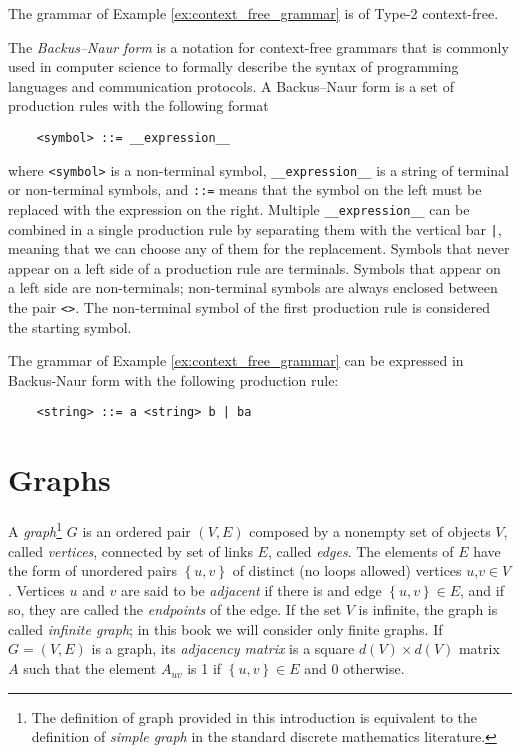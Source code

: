 \begin{example}
The grammar of Example \ref{ex:context_free_grammar} is of Type-2 context-free.
\end{example}

The \emph{Backus–Naur form} is a notation for context-free grammars that is commonly used in computer science to formally describe the syntax of programming languages and communication protocols. A Backus–Naur form is a set of production rules with the following format

\begin{verbatim}
    <symbol> ::= __expression__
\end{verbatim}

where \texttt{<symbol>} is a non-terminal symbol, \texttt{\_\_expression\_\_} is a string of terminal or non-terminal symbols, and \texttt{::=} means that the symbol on the left must be replaced with the expression on the right. Multiple  \texttt{\_\_expression\_\_} can be combined in a single production rule by separating them with the vertical bar \texttt{|}, meaning that we can choose any of them for the replacement. Symbols that never appear on a left side of a production rule are terminals. Symbols that appear on a left side are non-terminals; non-terminal symbols are always enclosed between the pair \texttt{<>}. The non-terminal symbol of the first production rule is considered the starting symbol.

\begin{example}
The grammar of Example \ref{ex:context_free_grammar} can be expressed in Backus-Naur form with the following production rule:
\begin{verbatim}
    <string> ::= a <string> b | ba
\end{verbatim}
\end{example}

%
%

\section{Graphs}
\label{sec:Graphs}

A \emph{graph}\footnote{The definition of graph provided in this introduction is equivalent to the definition of \emph{simple graph} in the standard discrete mathematics literature.} $G$ is an ordered pair $(V,E)$ composed by a nonempty set of objects $V$, called \emph{vertices}, connected by set of links $E$, called \emph{edges}. The elements of $E$ have the form of unordered pairs $\left\{ u,v\right\}$ of distinct (no loops allowed) vertices $u$,$v\in V$. Vertices $u$ and $v$ are said to be \emph{adjacent} if there is and edge $\left\{ u,v\right\} \in E$, and if so, they are called the \emph{endpoints} of the edge. If the set $V$ is infinite, the graph is called \emph{infinite graph}; in this book we will consider only finite graphs. If $G = (V,E)$ is a graph, its \emph{adjacency matrix} is a square $d(V) \times d(V)$ matrix $A$ such that the element $A_{uv}$ is 1 if $\left\{ u,v\right\} \in E$ and 0 otherwise.


